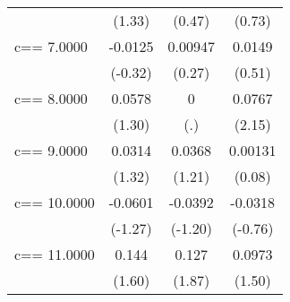 \begin{tabular}{l*{3}{c}}
                                  & (1.33)                                              & (0.47)                                              & (0.73)                                              \\
    [1em]
    c==     7.0000                & -0.0125                                             & 0.00947                                             & 0.0149                                              \\
                                  & (-0.32)                                             & (0.27)                                              & (0.51)                                              \\
    [1em]
    c==     8.0000                & 0.0578                                              & 0                                                   & 0.0767\sym{*}                                       \\
                                  & (1.30)                                              & (.)                                                 & (2.15)                                              \\
    [1em]
    c==     9.0000                & 0.0314                                              & 0.0368                                              & 0.00131                                             \\
                                  & (1.32)                                              & (1.21)                                              & (0.08)                                              \\
    [1em]
    c==    10.0000                & -0.0601                                             & -0.0392                                             & -0.0318                                             \\
                                  & (-1.27)                                             & (-1.20)                                             & (-0.76)                                             \\
    [1em]
    c==    11.0000                & 0.144                                               & 0.127                                               & 0.0973                                              \\
                                  & (1.60)                                              & (1.87)                                              & (1.50)                                              \\

\end{tabular}
